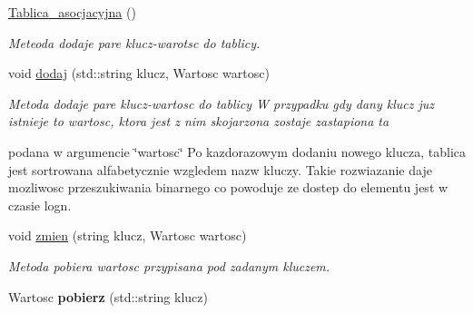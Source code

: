 \begin{DoxyCompactItemize}
\item 
\hyperlink{class_tablica__asocjacyjna_adc6a84da0c12ff6c483730ca87f2209e}{Tablica\-\_\-asocjacyjna} ()
\begin{DoxyCompactList}\small\item\em Meteoda dodaje pare klucz-\/warotsc do tablicy. \end{DoxyCompactList}\item 
void \hyperlink{class_tablica__asocjacyjna_a7eca8d386171766b0c8e2df6db8d3ac5}{dodaj} (std\-::string klucz, Wartosc wartosc)
\begin{DoxyCompactList}\small\item\em Metoda dodaje pare klucz-\/wartosc do tablicy W przypadku gdy dany klucz juz istnieje to wartosc, ktora jest z nim skojarzona zostaje zastapiona ta\par
 podana w argumencie \char`\"{}wartosc\char`\"{} Po kazdorazowym dodaniu nowego klucza, tablica jest sortrowana alfabetycznie wzgledem nazw kluczy. Takie rozwiazanie daje mozliwosc przeszukiwania binarnego co powoduje ze dostep do elementu jest w czasie logn. \end{DoxyCompactList}\item 
void \hyperlink{class_tablica__asocjacyjna_a2ff35eaf60d462d5ddf0cb28e70a89c9}{zmien} (string klucz, Wartosc wartosc)
\begin{DoxyCompactList}\small\item\em Metoda pobiera wartosc przypisana pod zadanym kluczem. \end{DoxyCompactList}\item 
\hypertarget{class_tablica__asocjacyjna_ad4e0d83caa204e319080437d4ab56251}{Wartosc {\bfseries pobierz} (std\-::string klucz)}\label{class_tablica__asocjacyjna_ad4e0d83caa204e319080437d4ab56251}


\end{DoxyCompactItemize}
